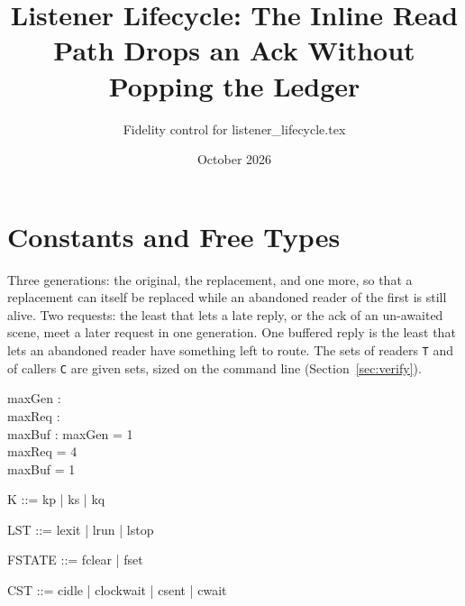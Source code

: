 \documentclass[a4paper,10pt,fleqn]{article}
\begin{document}
\title{Listener Lifecycle: The Inline Read Path Drops an Ack Without Popping the Ledger}
\author{Fidelity control for listener\_lifecycle.tex}
\date{October 2026}
\maketitle

\section{Constants and Free Types}

Three generations: the original, the replacement, and one more, so that a
replacement can itself be replaced while an abandoned reader of the first is
still alive.  Two requests: the least that lets a late reply, or the ack of an
un-awaited scene, meet a later request in one generation.  One buffered reply
is the least that lets an abandoned reader have something left to route.  The
sets of readers \texttt{T} and of callers \texttt{C} are given sets, sized on
the command line (Section~\ref{sec:verify}).

\begin{axdef}
  maxGen : \nat \\
  maxReq : \nat \\
  maxBuf : \nat
\where
  maxGen = 1 \\
  maxReq = 4 \\
  maxBuf = 1
\end{axdef}

\begin{zed}
  [T]
\end{zed}

\begin{zed}
  [C]
\end{zed}

\begin{zed}
  K ::= kp | ks | kq
\end{zed}

\begin{zed}
  LST ::= lexit | lrun | lstop
\end{zed}

\begin{zed}
  FSTATE ::= fclear | fset
\end{zed}

\begin{zed}
  CST ::= cidle | clockwait | csent | cwait
\end{zed}
\end{document}
